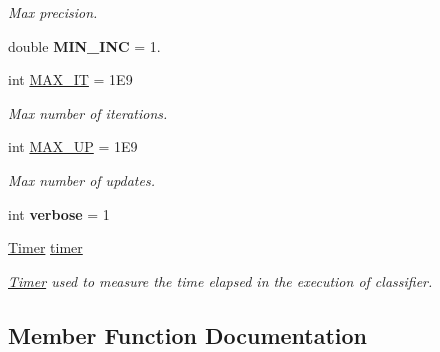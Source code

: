 \begin{DoxyCompactItemize}
\begin{DoxyCompactList}\small\item\em Max precision. \end{DoxyCompactList}\item 
double {\bfseries M\+I\+N\+\_\+\+I\+NC} = 1.\hypertarget{class_classifier_af06ecff6cbcf9aee87de3fdcf6b71a1a}{}\label{class_classifier_af06ecff6cbcf9aee87de3fdcf6b71a1a}

\item 
int \hyperlink{class_classifier_a3b7f1c31910fff58907bcfe2cfc6cf89}{M\+A\+X\+\_\+\+IT} = 1\+E9\hypertarget{class_classifier_a3b7f1c31910fff58907bcfe2cfc6cf89}{}\label{class_classifier_a3b7f1c31910fff58907bcfe2cfc6cf89}

\begin{DoxyCompactList}\small\item\em Max number of iterations. \end{DoxyCompactList}\item 
int \hyperlink{class_classifier_a8d3289755d689efa65ca009d4c4ffa13}{M\+A\+X\+\_\+\+UP} = 1\+E9\hypertarget{class_classifier_a8d3289755d689efa65ca009d4c4ffa13}{}\label{class_classifier_a8d3289755d689efa65ca009d4c4ffa13}

\begin{DoxyCompactList}\small\item\em Max number of updates. \end{DoxyCompactList}\item 
int {\bfseries verbose} = 1\hypertarget{class_classifier_ab76f30bc5403b4e7091cf810d3c96654}{}\label{class_classifier_ab76f30bc5403b4e7091cf810d3c96654}

\item 
\hyperlink{class_timer}{Timer} \hyperlink{class_classifier_a7426be6798e9a184e6d968f91a361a93}{timer}\hypertarget{class_classifier_a7426be6798e9a184e6d968f91a361a93}{}\label{class_classifier_a7426be6798e9a184e6d968f91a361a93}

\begin{DoxyCompactList}\small\item\em \hyperlink{class_timer}{Timer} used to measure the time elapsed in the execution of classifier. \end{DoxyCompactList}\end{DoxyCompactItemize}


\subsection{Member Function Documentation}
